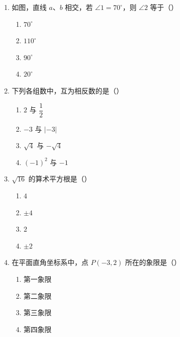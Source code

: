\documentclass[12pt, a4paper]{ctexart}
\newcommand{\blank}[1]{\underline{\hspace{#1}}}
\begin{document}
\begin{enumerate}[label=\textbf{\arabic*.}, leftmargin=2.5em]

\item 如图，直线 $a$、$b$ 相交，若 $\angle 1 = 70^{\circ}$，则 $\angle 2$ 等于（\blank{1cm}）
\begin{enumerate}[label=\Alph*., nosep]
\item $70^{\circ}$
\item $110^{\circ}$
\item $90^{\circ}$
\item $20^{\circ}$
\end{enumerate}

\vspace{6pt}

\item 下列各组数中，互为相反数的是（\blank{1cm}）
\begin{enumerate}[label=\Alph*., nosep]
\item $2$ 与 $\dfrac{1}{2}$
\item $-3$ 与 $|-3|$
\item $\sqrt{4}$ 与 $-\sqrt{4}$
\item $(-1)^2$ 与 $-1$
\end{enumerate}

\vspace{6pt}

\item $\sqrt{16}$ 的算术平方根是（\blank{1cm}）
\begin{enumerate}[label=\Alph*., nosep]
\item $4$
\item $\pm 4$
\item $2$
\item $\pm 2$
\end{enumerate}

\vspace{6pt}

\item 在平面直角坐标系中，点 $P(-3, 2)$ 所在的象限是（\blank{1cm}）
\begin{enumerate}[label=\Alph*., nosep]
\item 第一象限
\item 第二象限
\item 第三象限
\item 第四象限
\end{enumerate}

\vspace{6pt}


\end{enumerate}
\end{document}
